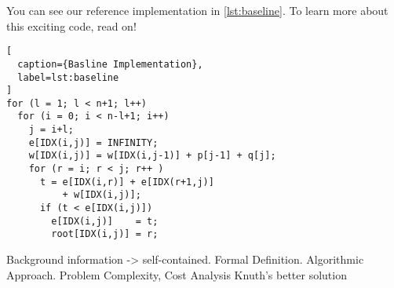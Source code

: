 
You can see our reference implementation in \autoref{lst:baseline}. To
learn more about this exciting code, read on!

\begin{lstlisting}[
  caption={Basline Implementation},
  label=lst:baseline
]
for (l = 1; l < n+1; l++)
  for (i = 0; i < n-l+1; i++)
    j = i+l;
    e[IDX(i,j)] = INFINITY;
    w[IDX(i,j)] = w[IDX(i,j-1)] + p[j-1] + q[j];
    for (r = i; r < j; r++ )
      t = e[IDX(i,r)] + e[IDX(r+1,j)]
          + w[IDX(i,j)];
      if (t < e[IDX(i,j)])
        e[IDX(i,j)]    = t;
        root[IDX(i,j)] = r;
\end{lstlisting}

Background information -> self-contained.
Formal Definition.
Algorithmic Approach.
Problem Complexity, Cost Analysis
Knuth's better solution
